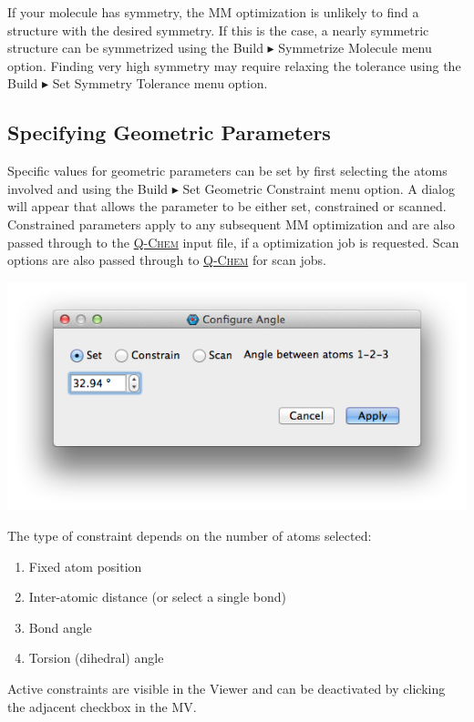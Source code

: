 \documentclass[a4paper,12pt]{article}
\newcommand{\qchem}{\href{http://q-chem.com}{{\scshape Q-Chem}}}
\begin{document}
If your molecule has symmetry, the MM optimization is unlikely to find a
structure with the desired symmetry.  If this is the case, a nearly symmetric
structure can be symmetrized using the Build $\blacktriangleright$ Symmetrize Molecule
menu option.  Finding very high symmetry may require relaxing the tolerance
using the Build $\blacktriangleright$ Set Symmetry Tolerance menu option.

\subsection{Specifying Geometric Parameters}

Specific values for geometric parameters can be set by first selecting the
atoms involved and using the Build $\blacktriangleright$ Set Geometric Constraint menu
option.  A dialog will appear that allows the parameter to be either set,
constrained or scanned.  Constrained parameters apply to any subsequent MM
optimization and are also passed through to the \qchem{} input file, if a
optimization job is requested.  Scan options are also passed through to
\qchem{} for scan jobs. \\

\begin{center}
\includegraphics[scale=0.5]{figures/ConstraintDialog.png}
\end{center}

The type of constraint depends on the number of atoms selected:
\begin{enumerate}
\item Fixed atom position
\item Inter-atomic distance (or select a single bond)
\item Bond angle
\item Torsion (dihedral) angle
\end{enumerate}

Active constraints are visible in the Viewer and can be deactivated by clicking
the adjacent checkbox in the MV.
\end{document}
